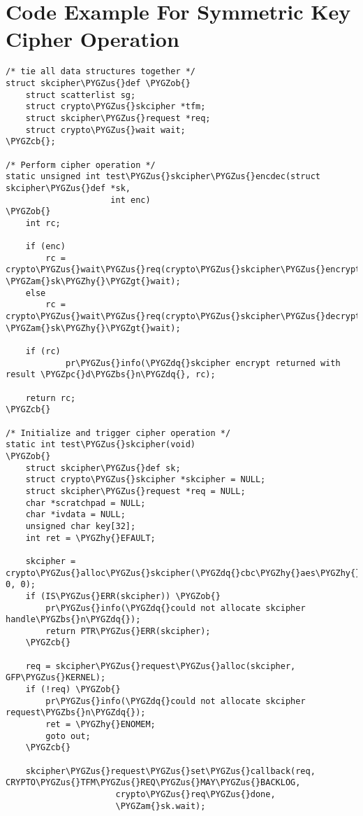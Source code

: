 \documentclass[a4paper,8pt,english]{sphinxmanual}
\def\PYGZbs{\char`\\}
\def\PYGZus{\char`\_}
\def\PYGZob{\char`\{}
\def\PYGZcb{\char`\}}
\def\PYGZam{\char`\&}
\def\PYGZgt{\char`\>}
\def\PYGZpc{\char`\%}
\def\PYGZhy{\char`\-}
\def\PYGZdq{\char`\"}
\begin{document}
\section{Code Example For Symmetric Key Cipher Operation}
\label{crypto/api-samples:code-example-for-symmetric-key-cipher-operation}
\begin{Verbatim}[commandchars=\\\{\}]
/* tie all data structures together */
struct skcipher\PYGZus{}def \PYGZob{}
    struct scatterlist sg;
    struct crypto\PYGZus{}skcipher *tfm;
    struct skcipher\PYGZus{}request *req;
    struct crypto\PYGZus{}wait wait;
\PYGZcb{};

/* Perform cipher operation */
static unsigned int test\PYGZus{}skcipher\PYGZus{}encdec(struct skcipher\PYGZus{}def *sk,
                     int enc)
\PYGZob{}
    int rc;

    if (enc)
        rc = crypto\PYGZus{}wait\PYGZus{}req(crypto\PYGZus{}skcipher\PYGZus{}encrypt(sk\PYGZhy{}\PYGZgt{}req), \PYGZam{}sk\PYGZhy{}\PYGZgt{}wait);
    else
        rc = crypto\PYGZus{}wait\PYGZus{}req(crypto\PYGZus{}skcipher\PYGZus{}decrypt(sk\PYGZhy{}\PYGZgt{}req), \PYGZam{}sk\PYGZhy{}\PYGZgt{}wait);

    if (rc)
            pr\PYGZus{}info(\PYGZdq{}skcipher encrypt returned with result \PYGZpc{}d\PYGZbs{}n\PYGZdq{}, rc);

    return rc;
\PYGZcb{}

/* Initialize and trigger cipher operation */
static int test\PYGZus{}skcipher(void)
\PYGZob{}
    struct skcipher\PYGZus{}def sk;
    struct crypto\PYGZus{}skcipher *skcipher = NULL;
    struct skcipher\PYGZus{}request *req = NULL;
    char *scratchpad = NULL;
    char *ivdata = NULL;
    unsigned char key[32];
    int ret = \PYGZhy{}EFAULT;

    skcipher = crypto\PYGZus{}alloc\PYGZus{}skcipher(\PYGZdq{}cbc\PYGZhy{}aes\PYGZhy{}aesni\PYGZdq{}, 0, 0);
    if (IS\PYGZus{}ERR(skcipher)) \PYGZob{}
        pr\PYGZus{}info(\PYGZdq{}could not allocate skcipher handle\PYGZbs{}n\PYGZdq{});
        return PTR\PYGZus{}ERR(skcipher);
    \PYGZcb{}

    req = skcipher\PYGZus{}request\PYGZus{}alloc(skcipher, GFP\PYGZus{}KERNEL);
    if (!req) \PYGZob{}
        pr\PYGZus{}info(\PYGZdq{}could not allocate skcipher request\PYGZbs{}n\PYGZdq{});
        ret = \PYGZhy{}ENOMEM;
        goto out;
    \PYGZcb{}

    skcipher\PYGZus{}request\PYGZus{}set\PYGZus{}callback(req, CRYPTO\PYGZus{}TFM\PYGZus{}REQ\PYGZus{}MAY\PYGZus{}BACKLOG,
                      crypto\PYGZus{}req\PYGZus{}done,
                      \PYGZam{}sk.wait);


\end{Verbatim}
\end{document}
